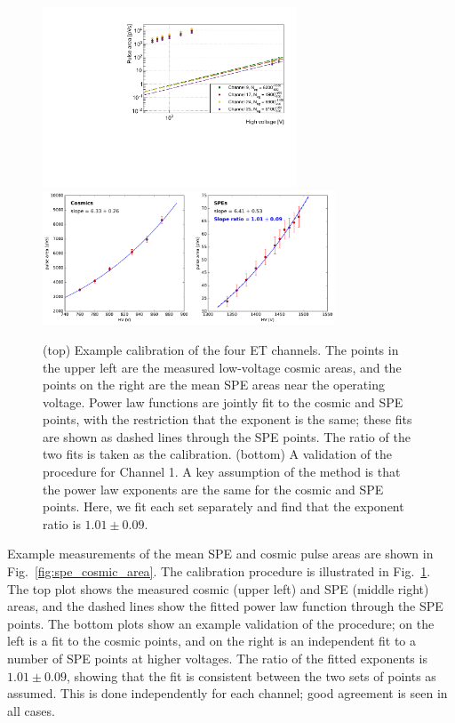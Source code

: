 {\begin{figure}[htbp]
  \begin{center}
    \includegraphics[width=0.675\textwidth]{figs/milliq/npe_calibration_ET.pdf} \\
    \includegraphics[width=0.775\textwidth]{figs/milliq/npe_calib_slope_comp.pdf}
    \caption{(top) Example \Npe calibration of the four ET channels. The points in the 
      upper left are the measured low-voltage cosmic areas, and the points on the
      right are the mean SPE areas near the operating voltage. Power law functions
      are jointly fit to the cosmic and SPE points, with the restriction that the exponent
      is the same; these fits are shown as dashed lines through the SPE points. The ratio
      of the two fits is taken as the \Npe calibration.
      (bottom) A validation of the procedure for Channel 1. A key assumption of the method is
      that the power law exponents are the same for the cosmic and SPE points. Here, we fit each set
      separately and find that the exponent ratio is $1.01\pm0.09$.
            }
    \label{fig:npe_calibration}
  \end{center}
\end{figure}

Example measurements of the mean SPE and cosmic pulse areas are shown in Fig.~\ref{fig:spe_cosmic_area}.
The \Npe calibration procedure is illustrated in Fig.~\ref{fig:npe_calibration}. The top plot
shows the measured cosmic (upper left) and SPE (middle right) areas, and the dashed lines
show the fitted power law function through the SPE points. The bottom plots show an example validation
of the procedure; on the left is a fit to the cosmic points, and on the right is an independent fit
to a number of SPE points at higher voltages. The ratio of the fitted exponents
is $1.01\pm0.09$, showing that the fit is consistent between the two sets of points as assumed.
This is done independently for each channel; good agreement is seen in all cases.


}
